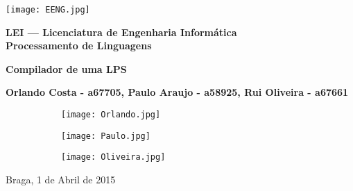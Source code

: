 \begin{titlepage}
\begin{center}

\begin{flushleft}
\texttt{[image: EENG.jpg]}\\
\end{flushleft}

\vspace{1.5cm}

\Large{\textbf{LEI --- Licenciatura de Engenharia Informática}}\\
\vspace{1cm}
\Large{\textbf{Processamento de Linguagens}}\\

\vspace{1cm}

\Huge{\textbf{Compilador de uma LPS}} \\

\vspace{2cm}

\Large{\textbf{Orlando Costa -  a67705, Paulo Araujo - a58925, Rui Oliveira - a67661}}\\
\begin{figure}[h]
\centering
\begin{subfigure}{.3\textwidth}
  \centering
  \texttt{[image: Orlando.jpg]}
\end{subfigure}
\begin{subfigure}{.3\textwidth}
  \centering
  \texttt{[image: Paulo.jpg]}
\end{subfigure}
\begin{subfigure}{.3\textwidth}
  \centering
  \texttt{[image: Oliveira.jpg]}
\end{subfigure}
\end{figure}

\vspace{1.5cm}
Braga, 1 de Abril de 2015

\end{center}

\end{titlepage}
